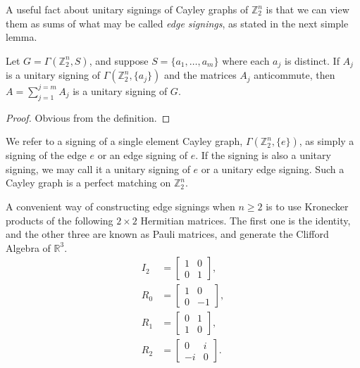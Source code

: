 A useful fact about unitary signings of Cayley graphs
of ${\mathbb{Z}_{2}^{n}}$ is
that we can view them as sums of what may be called 
{\em edge signings}, as stated in the next
simple lemma.
\begin{lemma}
\label{lm: add signings}
Let $G = \Gamma(\mathbb{Z}_{2}^{n}, S)$,
and suppose $S = \{a_1, \ldots, a_m \}$ where each $a_j$
is distinct. If $A_j$ is a unitary signing of
$\Gamma(\mathbb{Z}_{2}^{n}, \{a_j\})$ and the matrices
$A_j$ anticommute, then
$A = \sum_{j=1}^{j=m} A_j$ is a unitary signing of $G$.
\end{lemma}
\begin{proof}
Obvious from the definition.
\end{proof}

We refer to a signing of a single element Cayley graph, 
$\Gamma(\mathbb{Z}_{2}^{n}, \{e\})$, as simply a signing of 
the edge $e$ or an edge signing of $e$. If the signing is also a unitary signing, we may call it a unitary signing of $e$ or a unitary edge signing. Such a Cayley graph is a perfect matching on ${\mathbb{Z}_{2}^{n}}$.

A convenient way of constructing edge signings when $n \geq 2$ is to 
use Kronecker products of the following $2 \times 2$ Hermitian matrices.
The first one is the identity, and the other three are 
known as Pauli matrices, and generate the Clifford Algebra of $\mathbb{R}^3$. 
\begin{align*}
I_2 &=
\left[
\begin{array}{cc}
1 & 0 \\
0 & 1 
\end{array}
\right], \\
R_0 &=
\left[
\begin{array}{cc}
1 & 0 \\
0 & -1 
\end{array}
\right], \\
R_1 &=
\left[
\begin{array}{cc}
0 & 1 \\
1 & 0 
\end{array}
\right], \\
R_2 &=
\left[
\begin{array}{cc}
0 & i \\
-i & 0 
\end{array}
\right]. \\
\end{align*}

